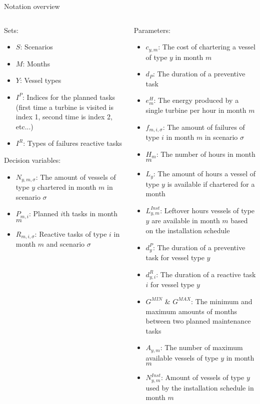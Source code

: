 \documentclass{beamer}
\begin{document}
\begin{frame}{Notation overview}
\tiny
\begin{columns}
\begin{column}{.48\textwidth}
Sets:
\begin{itemize}
\item $S$: Scenarios
\item $M$: Months
\item $Y$: Vessel types
\item $I^P$: Indices for the planned tasks (first time a turbine is visited is index 1, second time is index 2, etc...)
\item $I^R$: Types of failures reactive tasks
\end{itemize}

Decision variables:
\begin{itemize}
\item $N_{y,m,\sigma}$: The amount of vessels of type $y$ chartered in month $m$ in scenario $\sigma$
\item $P_{m,i}$: Planned $i$th tasks in month $m$
\item $R_{m,i,\sigma}$: Reactive tasks of type $i$ in month $m$ and scenario $\sigma$
\end{itemize}
\end{column}

\hfill

\begin{column}{.48\textwidth}
Parameters:
\begin{itemize}
\item $c_{y,m}$: The cost of chartering a vessel of type $y$ in month $m$
\item $d_P$: The duration of a preventive task
\item $e^H_m$: The energy produced by a single turbine per hour in month $m$
\item $f_{m,i,\sigma}$: The amount of failures of type $i$ in month $m$ in scenario $\sigma$
\item $H_m$: The number of hours in month $m$
\item $L_y$: The amount of hours a vessel of type $y$ is available if chartered for a month
\item $L^{Inst}_{y,m}$: Leftover hours vessels of type $y$ are available in month $m$ based on the installation schedule
\item $d^P_y$: The duration of a preventive task for vessel type $y$
\item $d^R_{y,i}$: The duration of a reactive task $i$ for vessel type $y$
\item $G^{MIN}$ \& $G^{MAX}$: The minimum and maximum amounts of months between two planned maintenance tasks
\item $A_{y,m}$: The number of maximum available vessels of type $y$ in month $m$
\item $N^{Inst}_{y,m}$: Amount of vessels of type $y$ used by the installation schedule in month $m$
\end{itemize}
\end{column}
\end{columns}
\end{frame}
\end{document}
